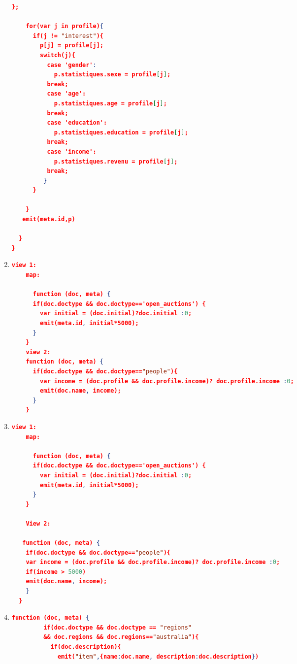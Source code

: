 \begin{enumerate}[label=Q\arabic*]
\begin{lstlisting}[language=JSON, basicstyle=\scriptsize]
            };
    
    for(var j in profile){
      if(j != "interest"){
       	p[j] = profile[j];
        switch(j){
          case 'gender':
            p.statistiques.sexe = profile[j];  
          break;
          case 'age':
            p.statistiques.age = profile[j];  
          break;
          case 'education':
            p.statistiques.education = profile[j];  
          break;
          case 'income':
            p.statistiques.revenu = profile[j];  
          break;
         }
      }
      
    }
   emit(meta.id,p) 
  
  }
}
	\end{lstlisting}
	
	
    \item \label{cb-q-11}%
	\begin{lstlisting}[language=JSON, basicstyle=\scriptsize]
	view 1: 
	map:
	
	  function (doc, meta) {
      if(doc.doctype && doc.doctype=='open_auctions') {
        var initial = (doc.initial)?doc.initial :0;
      	emit(meta.id, initial*5000);	
      }
    }
    view 2: 
    function (doc, meta) {
      if(doc.doctype && doc.doctype=="people"){
        var income = (doc.profile && doc.profile.income)? doc.profile.income :0;
        emit(doc.name, income);
      }
    }
	\end{lstlisting}
	
	\item \label{cb-q-12}%
	\begin{lstlisting}[language=JSON, basicstyle=\scriptsize]
	view 1: 
	map:
	
	  function (doc, meta) {
      if(doc.doctype && doc.doctype=='open_auctions') {
        var initial = (doc.initial)?doc.initial :0;
      	emit(meta.id, initial*5000);	
      }
    }
    
    View 2: 
    
   function (doc, meta) {
    if(doc.doctype && doc.doctype=="people"){
    var income = (doc.profile && doc.profile.income)? doc.profile.income :0;
    if(income > 5000)
    emit(doc.name, income);
    }
  }
	\end{lstlisting}
	
	
    \item \label{cb-q-13}%
	\begin{lstlisting}[language=JSON, basicstyle=\scriptsize]
	   function (doc, meta) {
	     if(doc.doctype && doc.doctype == "regions" 
	     && doc.regions && doc.regions=="australia"){
	       if(doc.description){
	         emit("item",{name:doc.name, description:doc.description})
	       

\end{lstlisting}
\end{enumerate}
